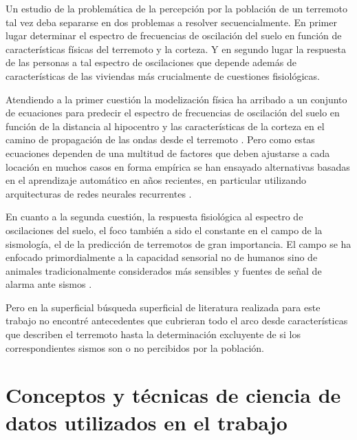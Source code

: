 \documentclass[a4paper]{report}
\begin{document}
Un estudio de la problemática de la percepción por la población de un terremoto tal vez deba separarse en dos problemas a resolver secuencialmente.
En primer lugar determinar el espectro de frecuencias de oscilación del suelo en función de características físicas del terremoto y la corteza.
Y en segundo lugar la respuesta de las personas a tal espectro de oscilaciones que depende además de características de las viviendas más crucialmente de cuestiones fisiológicas.

Atendiendo a la primer cuestión la modelización física ha arribado a un conjunto de ecuaciones para predecir el espectro de frecuencias de oscilación del suelo en función de la distancia al hipocentro y las características de la corteza en el camino de propagación de las ondas desde el terremoto \cite{lior_relation_2018}.
Pero como estas ecuaciones dependen de una multitud de factores que deben ajustarse a cada locación en muchos casos en forma empírica se han ensayado alternativas basadas en el aprendizaje automático en años recientes, en particular utilizando arquitecturas de redes neurales recurrentes \cite{datta_deepshake_2022}.

En cuanto a la segunda cuestión, la respuesta fisiológica al espectro de oscilaciones del suelo, el foco también a sido el constante en el campo de la sismología, el de la predicción de terremotos de gran importancia.
El campo se ha enfocado primordialmente a la capacidad sensorial no de humanos sino de animales tradicionalmente considerados más sensibles y fuentes de señal de alarma ante sismos \cite{kirschvink_earthquake_2000}.

Pero en la superficial búsqueda superficial de literatura realizada para este trabajo no encontré antecedentes que cubrieran todo el arco desde características que describen el terremoto hasta la determinación excluyente de si los correspondientes sismos son o no percibidos por la población.


\section{Conceptos y técnicas de ciencia de datos utilizados en el trabajo}

\end{document}
